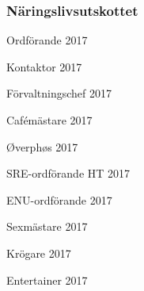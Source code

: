 \documentclass[../_main/handlingar.tex]{subfiles}
\begin{document}
\subsubsection*{Näringslivsutskottet}

\newpage
\begin{signatures}{10}
    \mvh
    \signature{Erik Månsson}{Ordförande 2017}
    \signature{Johan Karlberg}{Kontaktor 2017}
    \signature{Sophia Grimmeiss Grahm}{Förvaltningschef 2017}
    \signature{Daniel Bakic}{Cafémästare 2017}
    \signature{Niklas Gustafson}{Øverphøs 2017}
    \signature{Edvard Carlsson}{SRE-ordförande HT 2017}
    \signature{Josefine Sandström}{ENU-ordförande 2017}
    \signature{Linnea Sjödahl}{Sexmästare 2017}
    \signature{Markus Rahne}{Krögare 2017}
    \signature{Albin Nyström Eklund}{Entertainer 2017}
\end{signatures}
\end{document}
